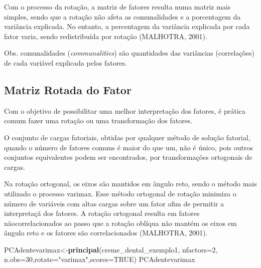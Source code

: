 \documentclass[12pt,brazil,oneside]{book}
\newenvironment{Shaded}{\begin{snugshade}}{\end{snugshade}}
\newcommand{\DataTypeTok}[1]{\textcolor[rgb]{0.13,0.29,0.53}{#1}}
\newcommand{\DecValTok}[1]{\textcolor[rgb]{0.00,0.00,0.81}{#1}}
\newcommand{\KeywordTok}[1]{\textcolor[rgb]{0.13,0.29,0.53}{\textbf{#1}}}
\newcommand{\NormalTok}[1]{#1}
\newcommand{\OtherTok}[1]{\textcolor[rgb]{0.56,0.35,0.01}{#1}}
\newcommand{\StringTok}[1]{\textcolor[rgb]{0.31,0.60,0.02}{#1}}
\begin{document}
Com o processo da rotação, a matriz de fatores resulta numa matriz mais simples, sendo que a rotação não afeta as comunalidades e a porcentagem da variância explicada. No entanto, a percentagem da variância explicada por cada fator varia, sendo redistribuída por rotação (MALHOTRA, 2001).

Obs. comunalidades (\emph{communalities}) são quantidades das variâncias (correlações) de cada variável explicada pelos fatores.

\hypertarget{matriz-rotada-do-fator}{%
\subsection{Matriz Rotada do Fator}\label{matriz-rotada-do-fator}}

Com o objetivo de possibilitar uma melhor interpretação dos fatores, é prática comum fazer uma rotação ou uma transformação dos fatores.

O conjunto de cargas fatoriais, obtidas por qualquer método de solução fatorial, quando o número de fatores comuns é maior do que um, não é único, pois outros conjuntos equivalentes podem ser encontrados, por transformações ortogonais de cargas.

Na rotação ortogonal, os eixos são mantidos em ângulo reto, sendo o método mais utilizado o processo varimax. Esse método ortogonal de rotação minimiza o número de variáveis com altas cargas sobre um fator afim de permitir a interpretaçã dos fatores. A rotação ortogonal resulta em fatores nãocorrelacionados ao passo que a rotação oblíqua não mantém os eixos em ângulo reto e os fatores são correlacionados (MALHOTRA, 2001).

\begin{Shaded}
\begin{Highlighting}[]
\NormalTok{PCAdentevarimax<-}\KeywordTok{principal}\NormalTok{(creme_dental_exemplo1, }\DataTypeTok{nfactors=}\DecValTok{2}\NormalTok{,}
            \DataTypeTok{n.obs=}\DecValTok{30}\NormalTok{,}\DataTypeTok{rotate=}\StringTok{"varimax"}\NormalTok{,}\DataTypeTok{scores=}\OtherTok{TRUE}\NormalTok{)}
\NormalTok{PCAdentevarimax}
\end{Highlighting}
\end{Shaded}
\end{document}
